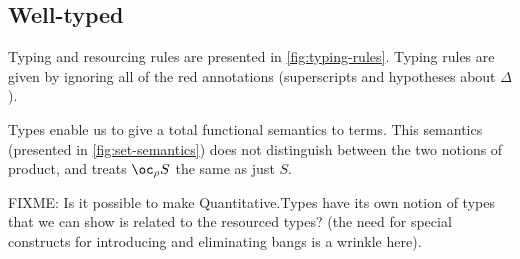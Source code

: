 \documentclass[sigplan,review]{acmart}\settopmatter{printfolios=true,printccs=false,printacmref=false}
\newcommand{\excl}[2]{\oc_{#1} #2}
\begin{document}
\subsection{Well-typed}

Typing and resourcing rules are presented in \autoref{fig:typing-rules}. Typing
rules are given by ignoring all of the red annotations (superscripts and
hypotheses about $\Delta$).

Types enable us to give a total functional semantics to terms. This semantics
(presented in \autoref{fig:set-semantics}) does not distinguish between the two
notions of product, and treats $\excl{\rho}{S}$ the same as just $S$.

FIXME:
Is it possible to make Quantitative.Types have its own notion of types
that we can show is related to the resourced types? (the need for
special constructs for introducing and eliminating bangs is a wrinkle
here).
\end{document}
